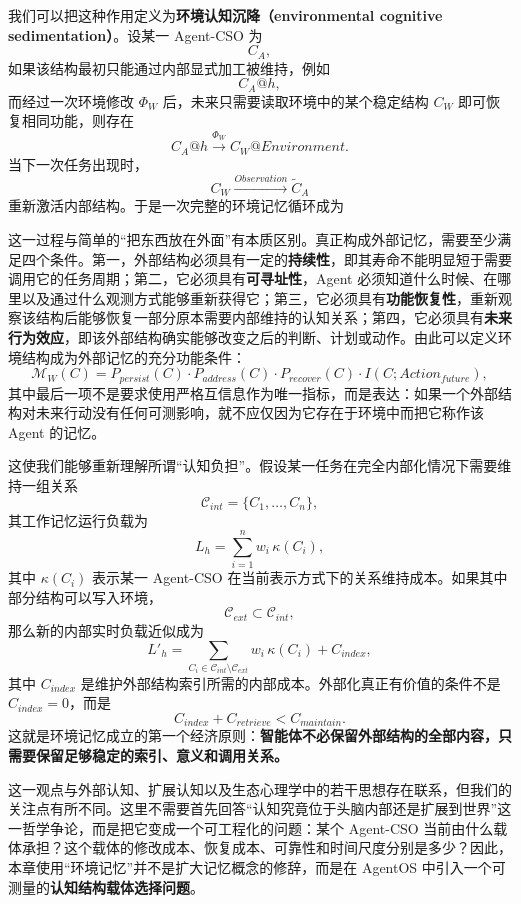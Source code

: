 我们可以把这种作用定义为\textbf{环境认知沉降（environmental cognitive sedimentation）}。设某一 Agent-CSO 为
\[
C_A,
\]
如果该结构最初只能通过内部显式加工被维持，例如
\[
C_A@h,
\]
而经过一次环境修改 $\Phi_W$ 后，未来只需要读取环境中的某个稳定结构 $C_W$ 即可恢复相同功能，则存在
\[
C_A@h
\xrightarrow{\Phi_W}
C_W@Environment.
\]
当下一次任务出现时，
\[
C_W
\xrightarrow{Observation}
\widetilde C_A
\]
重新激活内部结构。于是一次完整的环境记忆循环成为
\begin{statementbox}
\centering
{}
\end{statementbox}

这一过程与简单的``把东西放在外面''有本质区别。真正构成外部记忆，需要至少满足四个条件。第一，外部结构必须具有一定的\textbf{持续性}，即其寿命不能明显短于需要调用它的任务周期；第二，它必须具有\textbf{可寻址性}，Agent 必须知道什么时候、在哪里以及通过什么观测方式能够重新获得它；第三，它必须具有\textbf{功能恢复性}，重新观察该结构后能够恢复一部分原本需要内部维持的认知关系；第四，它必须具有\textbf{未来行为效应}，即该外部结构确实能够改变之后的判断、计划或动作。由此可以定义环境结构成为外部记忆的充分功能条件：
\[
\mathcal M_W(C)
=
P_{persist}(C)
\cdot
P_{address}(C)
\cdot
P_{recover}(C)
\cdot
I(C;Action_{future}),
\]
其中最后一项不是要求使用严格互信息作为唯一指标，而是表达：如果一个外部结构对未来行动没有任何可测影响，就不应仅因为它存在于环境中而把它称作该 Agent 的记忆。

这使我们能够重新理解所谓``认知负担''。假设某一任务在完全内部化情况下需要维持一组关系
\[
\mathcal C_{int}
=
\{C_1,\ldots,C_n\},
\]
其工作记忆运行负载为
\[
L_h
=
\sum_{i=1}^{n}
w_i\,\kappa(C_i),
\]
其中 $\kappa(C_i)$ 表示某一 Agent-CSO 在当前表示方式下的关系维持成本。如果其中部分结构可以写入环境，
\[
\mathcal C_{ext}
\subset
\mathcal C_{int},
\]
那么新的内部实时负载近似成为
\[
L'_h
=
\sum_{C_i\in
\mathcal C_{int}\setminus\mathcal C_{ext}}
w_i\,\kappa(C_i)
+
C_{index},
\]
其中 $C_{index}$ 是维护外部结构索引所需的内部成本。外部化真正有价值的条件不是 $C_{index}=0$，而是
\[
\boxed{
C_{index}
+
C_{retrieve}
<
C_{maintain}.
}
\]
这就是环境记忆成立的第一个经济原则：\textbf{智能体不必保留外部结构的全部内容，只需要保留足够稳定的索引、意义和调用关系。}

这一观点与外部认知、扩展认知以及生态心理学中的若干思想存在联系，但我们的关注点有所不同。这里不需要首先回答``认知究竟位于头脑内部还是扩展到世界''这一哲学争论，而是把它变成一个可工程化的问题：某个 Agent-CSO 当前由什么载体承担？这个载体的修改成本、恢复成本、可靠性和时间尺度分别是多少？因此，本章使用``环境记忆''并不是扩大记忆概念的修辞，而是在 AgentOS 中引入一个可测量的\textbf{认知结构载体选择问题}。


